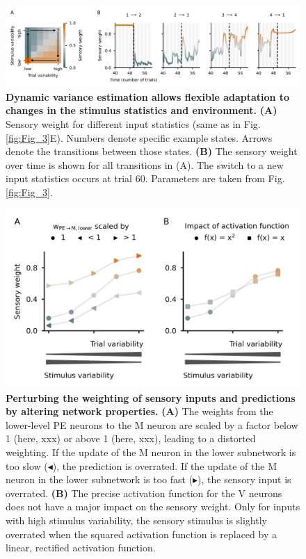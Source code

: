 \documentclass[10pt,a4paper,draft]{article}
\begin{document}
\begin{figure}[!h]
	\centering
    \includegraphics{../results/figures/final/Fig_3_S1}%
\caption{\footnotesize{\bf Dynamic variance estimation allows flexible adaptation to changes in the stimulus statistics and environment. \newline}  
{\bf (A)} Sensory weight for different input statistics (same as in Fig. \ref{fig:Fig_3}E). Numbers denote specific example states. Arrows denote the transitions between those states.
{\bf (B)} The sensory weight over time is shown for all transitions in (A). The switch to a new input statistics occurs at trial 60. Parameters are taken from Fig. \ref{fig:Fig_3}.
}
\label{fig:Fig_3_S1}
\end{figure}


\begin{figure}[!h]
	\centering
    \includegraphics{../results/figures/final/Fig_3_S2}%
\caption{\footnotesize{\bf Perturbing the weighting of sensory inputs and predictions by altering  network properties. \newline}  
{\bf (A)} The weights from the lower-level PE neurons to the M neuron are scaled by a factor below 1 (here, xxx) or above 1 (here, xxx), leading to a distorted weighting. If the update of the M neuron in the lower subnetwork is too slow ($\blacktriangleleft$), the prediction is overrated. If the update of the M neuron in the lower subnetwork is too fast ($\blacktriangleright$), the sensory input is overrated.
{\bf (B)} The precise activation function for the V neurons does not have a major impact on the sensory weight. Only for inputs with high stimulus variability, the sensory stimulus is slightly overrated when the squared activation function is replaced by a linear, rectified activation function.
}
\label{fig:Fig_3_S2}
\end{figure}
\end{document}
